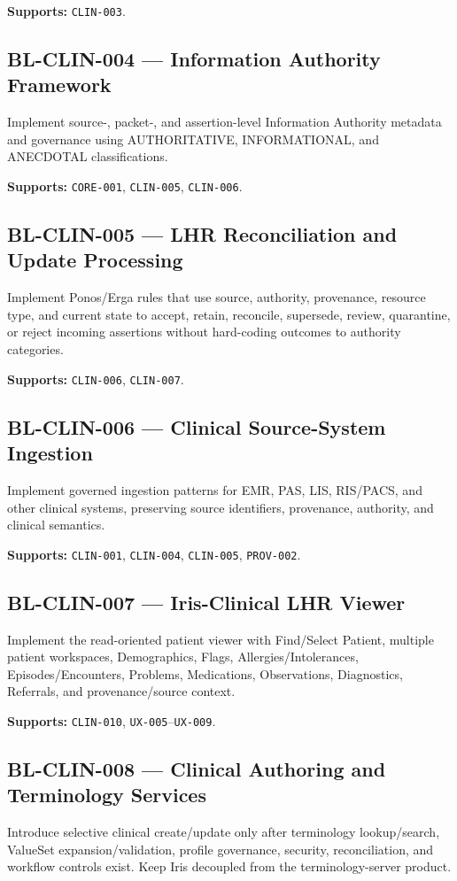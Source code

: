 \textbf{Supports:} \texttt{CLIN-003}.

\subsection{BL-CLIN-004 --- Information Authority Framework}
Implement source-, packet-, and assertion-level Information Authority metadata and governance using AUTHORITATIVE, INFORMATIONAL, and ANECDOTAL classifications.

\textbf{Supports:} \texttt{CORE-001}, \texttt{CLIN-005}, \texttt{CLIN-006}.

\subsection{BL-CLIN-005 --- LHR Reconciliation and Update Processing}
Implement Ponos/Erga rules that use source, authority, provenance, resource type, and current state to accept, retain, reconcile, supersede, review, quarantine, or reject incoming assertions without hard-coding outcomes to authority categories.

\textbf{Supports:} \texttt{CLIN-006}, \texttt{CLIN-007}.

\subsection{BL-CLIN-006 --- Clinical Source-System Ingestion}
Implement governed ingestion patterns for EMR, PAS, LIS, RIS/PACS, and other clinical systems, preserving source identifiers, provenance, authority, and clinical semantics.

\textbf{Supports:} \texttt{CLIN-001}, \texttt{CLIN-004}, \texttt{CLIN-005}, \texttt{PROV-002}.

\subsection{BL-CLIN-007 --- Iris-Clinical LHR Viewer}
Implement the read-oriented patient viewer with Find/Select Patient, multiple patient workspaces, Demographics, Flags, Allergies/Intolerances, Episodes/Encounters, Problems, Medications, Observations, Diagnostics, Referrals, and provenance/source context.

\textbf{Supports:} \texttt{CLIN-010}, \texttt{UX-005}--\texttt{UX-009}.

\subsection{BL-CLIN-008 --- Clinical Authoring and Terminology Services}
Introduce selective clinical create/update only after terminology lookup/search, ValueSet expansion/validation, profile governance, security, reconciliation, and workflow controls exist. Keep Iris decoupled from the terminology-server product.

